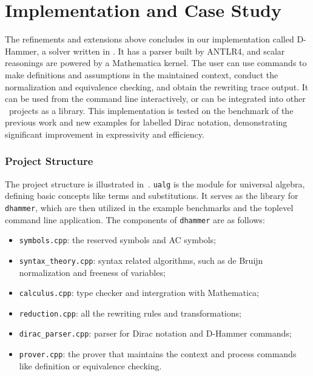 
\section{Implementation and Case Study}
The refinements and extensions above concludes in our implementation called D-Hammer, a solver written in \CC. It has a parser built by ANTLR4, and scalar reasonings are powered by a Mathematica kernel. The user can use commands to make definitions and assumptions in the maintained context, conduct the normalization and equivalence checking, and obtain the rewriting trace output. 
It can be used from the command line interactively, or can be integrated into other \CC\ projects as a library.
This implementation is tested on the benchmark of the previous work and new examples for labelled Dirac notation, demonstrating significant improvement in expressivity and efficiency. 

\subsubsection{Project Structure}
The project structure is illustrated in~.
\texttt{ualg} is the module for universal algebra, defining basic concepts like terms and substitutions. It serves as the library for \texttt{dhammer}, which are then utilized in the example benchmarks and the toplevel command line application. The components of \texttt{dhammer} are as follows:
\begin{itemize}
    \item \texttt{symbols.cpp}: the reserved symbols and AC symbols;
    \item \texttt{syntax\_theory.cpp}: syntax related algorithms, such as de Bruijn normalization and freeness of variables;
    \item \texttt{calculus.cpp}: type checker and intergration with Mathematica;
    \item \texttt{reduction.cpp}: all the rewriting rules and transformations;
    \item \texttt{dirac\_parser.cpp}: parser for Dirac notation and D-Hammer commands;
    \item \texttt{prover.cpp}: the prover that maintains the context and process commands like definition or equivalence checking.
\end{itemize}



